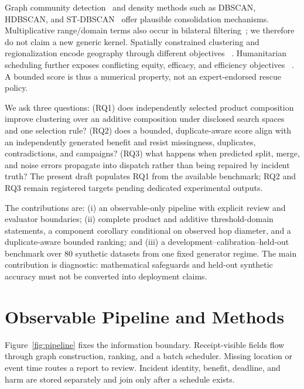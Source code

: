 \documentclass[runningheads]{llncs}
\begin{document}
Graph community detection~\cite{blondel2008louvain,traag2019leiden} and
density methods such as DBSCAN, HDBSCAN, and
ST-DBSCAN~\cite{ester1996dbscan,campello2013hdbscan,birant2007stdbscan}
offer plausible consolidation mechanisms. Multiplicative range/domain terms
also occur in bilateral filtering~\cite{tomasi1998bilateral}; we therefore do
not claim a new generic kernel. Spatially constrained clustering and
regionalization encode geography through different objectives
~\cite{chavent2018clustgeo,assuncao2006efficient}. Humanitarian scheduling further exposes
conflicting equity, efficacy, and efficiency objectives
~\cite{gralla2014review,huang2012models,vitoriano2011multicriteria}. A bounded
score is thus a numerical property, not an expert-endorsed rescue policy.

We ask three questions: (RQ1) does independently selected product composition
improve clustering over an additive composition under disclosed search spaces
and one selection rule? (RQ2) does a bounded, duplicate-aware score align with
an independently generated benefit and resist missingness, duplicates,
contradictions, and campaigns? (RQ3) what happens when predicted split, merge,
and noise errors propagate into dispatch rather than being repaired by incident
truth? The present draft populates RQ1 from the available benchmark; RQ2 and
RQ3 remain registered targets pending dedicated experimental outputs.

The contributions are: (i) an observable-only pipeline with explicit review
and evaluator boundaries; (ii) complete product and additive threshold-domain
statements, a component corollary conditional on observed hop diameter, and a
duplicate-aware bounded ranking; and (iii) a development--calibration--held-out
benchmark over 80 synthetic datasets from one fixed generator regime. The main
contribution is diagnostic: mathematical safeguards and held-out synthetic
accuracy must not be converted into deployment claims.

\section{Observable Pipeline and Methods}

Figure~\ref{fig:pipeline} fixes the information boundary. Receipt-visible
fields flow through graph construction, ranking, and a batch scheduler. Missing
location or event time routes a report to review. Incident identity, benefit,
deadline, and harm are stored separately and join only after a schedule exists.
\end{document}

